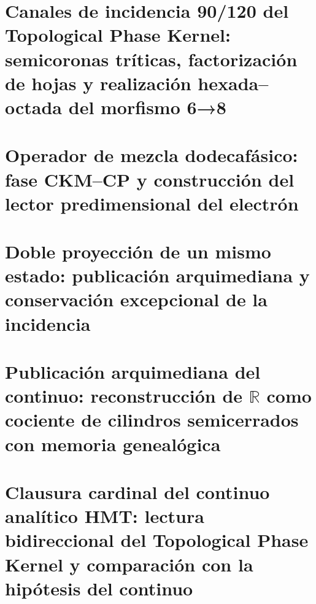 \chapter{Canales de incidencia 90/120 del Topological Phase Kernel: semicoronas tríticas, factorización de hojas y realización hexada–octada del morfismo 6→8}
\label{chap:sucesor-102-15}
\begin{HMTScientificOwnerSubordinated}

\end{HMTScientificOwnerSubordinated}


\chapter{Operador de mezcla dodecafásico: fase CKM–CP y construcción del lector predimensional del electrón}
\label{chap:sucesor-102-16}


\chapter{Doble proyección de un mismo estado: publicación arquimediana y conservación excepcional de la incidencia}
\label{chap:sucesor-102-17}
\label{chap:doble}



\chapter{Publicación arquimediana del continuo: reconstrucción de \texorpdfstring{\(\mathbb R\)}{R} como cociente de cilindros semicerrados con memoria genealógica}
\label{chap:sucesor-102-18}

\begin{HMTSpiralIntegratedBody}

\end{HMTSpiralIntegratedBody}

\chapter{Clausura cardinal del continuo analítico HMT: lectura bidireccional del Topological Phase Kernel y comparación con la hipótesis del continuo}
\label{chap:sucesor-102-19}



